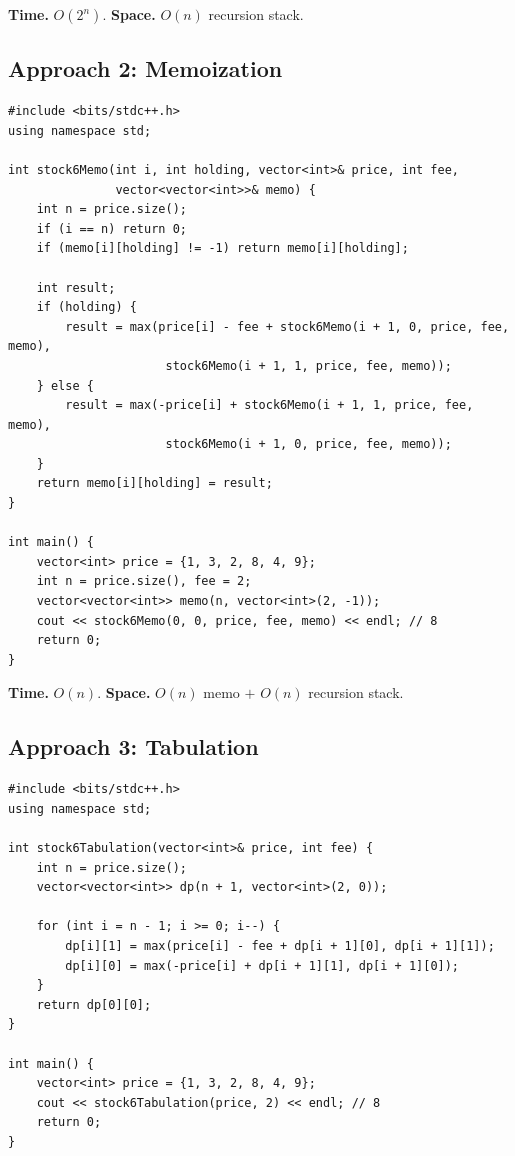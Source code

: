 \begin{complexitybox}
\textbf{Time.} $O(2^n)$.
\textbf{Space.} $O(n)$ recursion stack.
\end{complexitybox}

\subsection*{Approach 2: Memoization}

\begin{lstlisting}
#include <bits/stdc++.h>
using namespace std;

int stock6Memo(int i, int holding, vector<int>& price, int fee,
               vector<vector<int>>& memo) {
    int n = price.size();
    if (i == n) return 0;
    if (memo[i][holding] != -1) return memo[i][holding];

    int result;
    if (holding) {
        result = max(price[i] - fee + stock6Memo(i + 1, 0, price, fee, memo),
                      stock6Memo(i + 1, 1, price, fee, memo));
    } else {
        result = max(-price[i] + stock6Memo(i + 1, 1, price, fee, memo),
                      stock6Memo(i + 1, 0, price, fee, memo));
    }
    return memo[i][holding] = result;
}

int main() {
    vector<int> price = {1, 3, 2, 8, 4, 9};
    int n = price.size(), fee = 2;
    vector<vector<int>> memo(n, vector<int>(2, -1));
    cout << stock6Memo(0, 0, price, fee, memo) << endl; // 8
    return 0;
}
\end{lstlisting}

\begin{complexitybox}
\textbf{Time.} $O(n)$.
\textbf{Space.} $O(n)$ memo $+$ $O(n)$ recursion stack.
\end{complexitybox}

\subsection*{Approach 3: Tabulation}

\begin{lstlisting}
#include <bits/stdc++.h>
using namespace std;

int stock6Tabulation(vector<int>& price, int fee) {
    int n = price.size();
    vector<vector<int>> dp(n + 1, vector<int>(2, 0));

    for (int i = n - 1; i >= 0; i--) {
        dp[i][1] = max(price[i] - fee + dp[i + 1][0], dp[i + 1][1]);
        dp[i][0] = max(-price[i] + dp[i + 1][1], dp[i + 1][0]);
    }
    return dp[0][0];
}

int main() {
    vector<int> price = {1, 3, 2, 8, 4, 9};
    cout << stock6Tabulation(price, 2) << endl; // 8
    return 0;
}
\end{lstlisting}

